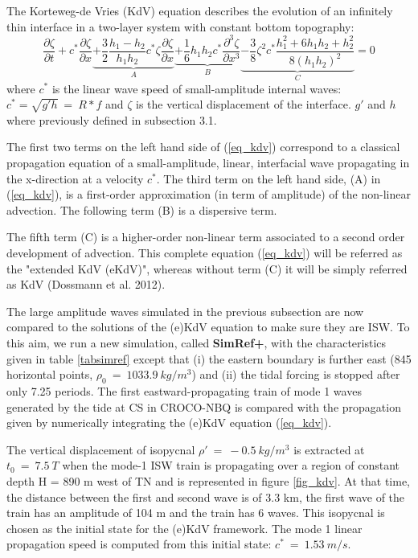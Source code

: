 The Korteweg-de Vries (KdV) equation describes the evolution of an infinitely thin interface in a two-layer system with constant bottom topography:
\begin{equation}
\frac{\partial \zeta}{\partial t} 
+c^* \frac{\partial \zeta}{\partial x}
\underbrace{+ \frac{3}{2} \frac{h_1-h_2}{h_1h_2} c^* \zeta \frac{\partial \zeta}{\partial x} }_{A}
\underbrace{+ \frac{1}{6} h_1h_2c^* \frac{\partial ^3 \zeta}{\partial x^3} }_{B}
\underbrace{ - \frac{3}{8}\zeta^2c^*\frac{h_1^2+6h_1h_2+h_2^2}{8(h_1h_2)^2} }_{C}
=0
\label{eq_kdv}
\end{equation}
where $c^*$ is the linear wave speed of small-amplitude internal waves: $c^*=\sqrt{g' h}\ = \ R*f$ and $\zeta$ is the vertical displacement of the interface. $g'$ and $h$ where previously defined in subsection 3.1.

The first two terms on the left hand side of (\ref{eq_kdv}) correspond to a classical propagation equation of a small-amplitude, linear, interfacial wave propagating in the x-direction at a velocity $c^*$. The third term on the left hand side, (A) in (\ref{eq_kdv}), is a first-order approximation (in term of amplitude) of the non-linear advection. The following term (B) is a dispersive term.

The fifth term (C) is a higher-order non-linear term associated to a second order development of advection. This complete equation (\ref{eq_kdv}) will be referred as the "extended KdV (eKdV)", whereas without term (C) it will be simply referred as KdV (Dossmann et al. 2012). 

The large amplitude waves simulated in the previous subsection are now compared to the solutions of the (e)KdV equation to make sure they are ISW. To this aim, we run a new simulation, called \textbf{SimRef+}, with the characteristics given in table \ref{tabsimref} except that (i) the eastern boundary is further east (845 horizontal points, $\rho_0\ =\ 1033.9 \ kg/m^3$) and (ii) the tidal forcing is stopped after only 7.25 periods. The first eastward-propagating train of mode 1 waves generated by the tide at CS in CROCO-NBQ is compared with the propagation given by numerically integrating the (e)KdV equation (\ref{eq_kdv}).

The vertical displacement of isopycnal $\rho'\ =\ -0.5\ kg/m^3$ is extracted at $t_0\ =\ 7.5\ T$ when the mode-1 ISW train is propagating over a region of constant depth H = 890 m west of TN and is represented in figure \ref{fig_kdv}. At that time, the distance between the first and second wave is of 3.3 km, the first wave of the train has an amplitude of 104 m and the train has 6 waves. This isopycnal is chosen as the initial state for the (e)KdV framework. The mode 1 linear propagation speed is computed from this initial state: $c^*\ =\ 1.53\ m/s$.

